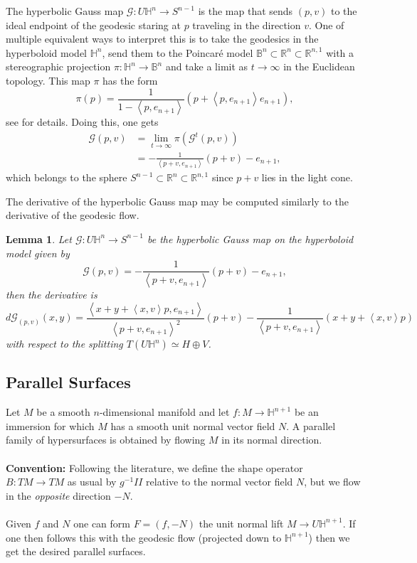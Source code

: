 \documentclass{amsart}
\newcommand{\R}{\mathbb{R}}
\newcommand{\two}{I\!\!I}
\newtheorem{lem}[thm]{Lemma}
\numberwithin{equation}{section}
\renewcommand{\H}{\mathbb{H}}
\begin{document}
The hyperbolic Gauss map $\mathcal{G}:U\H^n \to S^{n-1}$ is the map that sends $(p,v)$ to the ideal endpoint of the geodesic staring at $p$ traveling in the direction $v$. 
One of multiple equivalent ways to interpret this is to take the geodesics in the hyperboloid model $\H^n$, send them to the Poincar\'e model $\mathbb{B}^n \subset \R^n \subset \R^{n,1}$ with a stereographic projection $\pi: \H^n \to \mathbb{B}^n$ and take a limit as $t\to \infty$ in the Euclidean topology. 
This map $\pi$ has the form
\[
\pi(p) = \frac{1}{1 - \left< p, e_{n+1} \right>}(p + \left<p,e_{n+1}\right> e_{n+1}),
\]
see \cite{Lee2018} for details. 
Doing this, one gets 
\begin{align*}
\mathcal{G}(p,v) 
&= \lim_{t \to \infty} \pi(\mathcal{G}^t(p,v)) \\
&= -\frac{1}{\left<p+v,e_{n+1}\right>} (p+v) - e_{n+1},
\end{align*} 
which belongs to the sphere $S^{n-1} \subset \R^n \subset \R^{n,1}$ since $p+v$ lies in the light cone. 

The derivative of the hyperbolic Gauss map may be computed similarly to the derivative of the geodesic flow. 

\begin{lem}
Let $\mathcal{G}:U\H^n \to S^{n-1}$ be the hyperbolic Gauss map on the hyperboloid model given by 
\[
\mathcal{G}(p,v) = -\frac{1}{\left<p+v,e_{n+1}\right>}(p+v) - e_{n+1},
\]
then the derivative is 
\[
d\mathcal{G}_{(p,v)}(x,y)
=\frac{\left< x + y + \left<x,v\right>p, e_{n+1} \right>}{\left< p + v, e_{n+1} \right>^2}(p+v) - \frac{1}{\left< p + v, e_{n+1} \right>}(x + y + \left<x,v\right>p)
\]
with respect to the splitting $T(U\H^n) \simeq H \oplus V$.
\end{lem}

\subsection{Parallel Surfaces}

Let $M$ be a smooth $n$-dimensional manifold and let $f: M \to \H^{n+1}$ be an immersion for which $M$ has a smooth unit normal vector field $N$.
A parallel family of hypersurfaces is obtained by flowing $M$ in its normal direction. 
\\
\\
\noindent
{\bf Convention:} Following the literature, we define the shape operator $B: TM \to TM$ as usual by $g^{-1}\two$ relative to the normal vector field $N$, but we flow in the \emph{opposite} direction $-N$. 
\\
\\
Given $f$ and $N$ one can form $F = (f ,-N)$ the unit normal lift $M \to U\H^{n+1}$.
If one then follows this with the geodesic flow (projected down to $\H^{n+1}$) then we get the desired parallel surfaces.
\end{document}
